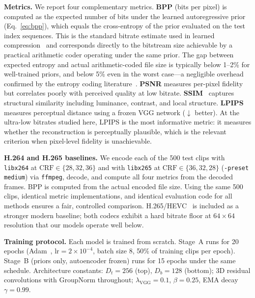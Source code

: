 \documentclass[sigconf, screen, review, anonymous]{acmart}
\begin{document}
\noindent\textbf{Metrics.}
We report four complementary metrics.
\textbf{BPP} (bits per pixel) is computed as the expected number of
bits under the learned autoregressive prior (Eq.~\eqref{eq:bpp}),
which equals the cross-entropy of the prior evaluated on the test
index sequences. This is the standard bitrate estimate used in learned
compression~\cite{balle2018hyperprior,minnen2018joint} and corresponds
directly to the bitstream size achievable by a practical arithmetic
coder operating under the same prior. The gap between expected entropy
and actual arithmetic-coded file size is typically below 1--2\% for
well-trained priors, and below 5\% even in the worst case---a
negligible overhead confirmed by the entropy coding
literature~\cite{minnen2018joint}.
\textbf{PSNR} measures per-pixel fidelity but correlates poorly with
perceived quality at low bitrate.
\textbf{SSIM}~\cite{wang2004ssim} captures structural similarity
including luminance, contrast, and local structure.
\textbf{LPIPS}~\cite{zhang2018lpips} measures perceptual distance using
a frozen VGG network ($\downarrow$ better).
At the ultra-low bitrates studied here, LPIPS is the most informative
metric: it measures whether the reconstruction is perceptually
plausible, which is the relevant criterion when pixel-level fidelity is
unachievable.

\noindent\textbf{H.264 and H.265 baselines.}
We encode each of the 500 test clips with \texttt{libx264} at
$\mathrm{CRF} \in \{28, 32, 36\}$ and with \texttt{libx265} at
$\mathrm{CRF} \in \{36, 32, 28\}$ (\texttt{-preset medium}) via
\texttt{ffmpeg}, decode, and compute all four metrics from the decoded
frames. BPP is computed from the actual encoded file size. Using the
same 500 clips, identical metric implementations, and identical
evaluation code for all methods ensures a fair, controlled comparison.
H.265/HEVC~\cite{sullivan2012hevc} is included as a stronger modern
baseline; both codecs exhibit a hard bitrate floor at $64\!\times\!64$
resolution that our models operate well below.

\noindent\textbf{Training protocol.}
Each model is trained from scratch. Stage~A runs for 20 epochs (Adam~\cite{kingma2014adam},
$\mathrm{lr}{=}2\!\times\!10^{-4}$, batch size 8, 50\% of training
clips per epoch). Stage~B (priors only, autoencoder frozen) runs for
15 epochs under the same schedule. Architecture constants:
$D_t{=}256$ (top), $D_b{=}128$ (bottom); 3D residual convolutions
with GroupNorm throughout; $\lambda_\text{VGG}{=}0.1$,
$\beta{=}0.25$, EMA decay $\gamma{=}0.99$.
\end{document}
